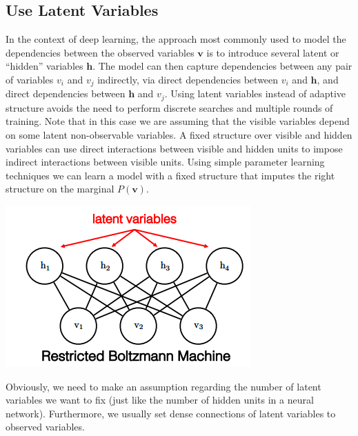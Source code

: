 \subsection{Use Latent Variables}
In the context of deep learning, the approach most commonly used to model the dependencies between the observed variables $\textbf{v}$ is to introduce several latent or “hidden” variables $\textbf{h}$. The model can then capture dependencies between any pair of variables $v_i$ and $v_j$ indirectly, via direct dependencies between $v_i$ and $\textbf{h}$, and
direct dependencies between $\textbf{h}$ and $v_j$. Using latent variables instead of adaptive structure avoids the need to perform discrete searches and multiple rounds of training. Note that in this case we are assuming that the visible variables depend on some latent non-observable variables.\newline\newline
A fixed structure over visible and hidden variables can use direct interactions between visible and hidden units to impose indirect interactions between visible units. Using simple parameter learning techniques we can learn a model with a fixed structure that imputes the right structure on the marginal $P(\textbf{v})$. 
\begin{center}
    \includegraphics[]{images/RBM.png}
\end{center}
Obviously, we need to make an assumption regarding the number of latent variables we want to fix (just like the number of hidden units in a neural network). Furthermore, we usually set dense connections of latent variables to observed variables.

